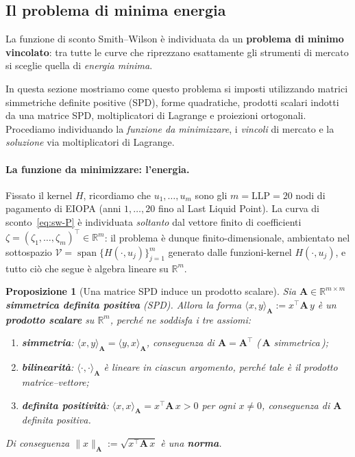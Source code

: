 \documentclass[11pt,a4paper]{article}
\theoremstyle{plain}
\newtheorem{proposizione}[teorema]{Proposizione}
\theoremstyle{definition}
\theoremstyle{remark}
\newcommand{\LLP}{\mathrm{LLP}}
\newcommand{\transp}{^{\!\top}}
\begin{document}
\subsection{Il problema di minima energia}
\label{sec:minenergia}

La funzione di sconto Smith--Wilson \`e individuata da un \textbf{problema di minimo
vincolato}: tra tutte le curve che riprezzano esattamente gli strumenti di mercato si
sceglie quella di \emph{energia minima}.

In questa sezione mostriamo come questo problema si imposti utilizzando matrici simmetriche definite positive
(SPD), forme quadratiche, prodotti scalari indotti da una matrice SPD, moltiplicatori di
Lagrange e proiezioni ortogonali. Procediamo individuando la \emph{funzione da minimizzare}, i \emph{vincoli} di mercato
e la \emph{soluzione} via moltiplicatori di Lagrange.

\paragraph{La funzione da minimizzare: l'energia.}
Fissato il kernel $H$, ricordiamo che $u_1,\ldots,u_m$ sono gli $m=\LLP=20$ nodi di
pagamento di EIOPA (anni $1,\ldots,20$ fino al Last Liquid Point). La curva di sconto~\eqref{eq:sw-P}
\`e individuata \emph{soltanto} dal vettore finito di coefficienti $\zeta=(\zeta_1,\ldots,\zeta_m)\transp
\in\mathbb{R}^m$: il problema \`e dunque finito-dimensionale, ambientato nel sottospazio
$\mathcal{V} = \operatorname{span}\{H(\cdot,u_j)\}_{j=1}^{m}$ generato dalle funzioni-kernel
$H(\cdot,u_j)$, e tutto ci\`o che segue \`e algebra lineare su $\mathbb{R}^m$.

\begin{proposizione}[Una matrice SPD induce un prodotto scalare]
\label{oss:spd-prodotto}
Sia $\mathbf{A}\in\mathbb{R}^{m\times m}$ \textbf{simmetrica definita positiva} (SPD).
Allora la forma $\langle x,y\rangle_{\mathbf{A}} := x\transp \mathbf{A}\, y$ \`e un
\textbf{prodotto scalare} su $\mathbb{R}^m$, perch\'e ne soddisfa i tre assiomi:
\begin{enumerate}
  \item \textbf{simmetria}: $\langle x,y\rangle_{\mathbf{A}} = \langle y,x\rangle_{\mathbf{A}}$,
        conseguenza di $\mathbf{A} = \mathbf{A}\transp$ (\,$\mathbf{A}$ \emph{simmetrica}\,);
  \item \textbf{bilinearit\`a}: $\langle \cdot,\cdot\rangle_{\mathbf{A}}$ \`e lineare in
        ciascun argomento, perch\'e tale \`e il prodotto matrice--vettore;
  \item \textbf{definita positivit\`a}: $\langle x,x\rangle_{\mathbf{A}} = x\transp\mathbf{A}\,x > 0$
        per ogni $x\neq 0$, conseguenza di $\mathbf{A}$ \emph{definita positiva}.
\end{enumerate}
Di conseguenza $\|x\|_{\mathbf{A}} := \sqrt{x\transp \mathbf{A}\, x}$ \`e una \textbf{norma}.
\end{proposizione}
\end{document}
